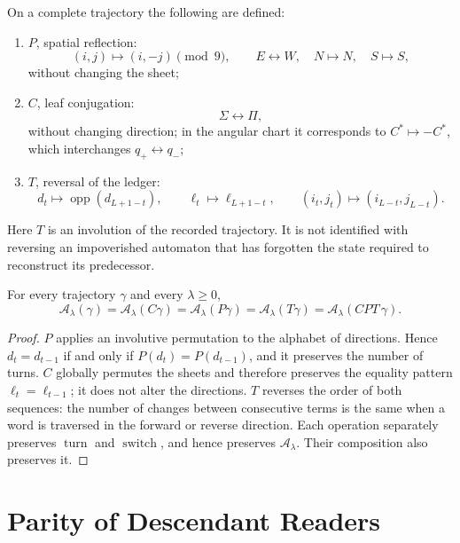 \begin{definition}
\label{def:cpt-discreto-rutas-rev6}
On a complete trajectory the following are defined:
\begin{enumerate}
\item \(P\), spatial reflection:
\[
 (i,j)\longmapsto(i,-j)\pmod9,
 \qquad E\leftrightarrow W,\quad N\mapsto N,\quad S\mapsto S,
\]
without changing the sheet;
\item \(C\), leaf conjugation:
\[
 \Sigma\leftrightarrow\Pi,
\]
without changing direction; in the angular chart it corresponds to
\(C^*\mapsto-C^*\), which interchanges \(q_+\leftrightarrow q_-\);
\item \(T\), reversal of the ledger:
\[
 d_t\longmapsto\operatorname{opp}(d_{L+1-t}),
 \qquad
 \ell_t\longmapsto\ell_{L+1-t},
 \qquad
 (i_t,j_t)\longmapsto(i_{L-t},j_{L-t}).
\]
\end{enumerate}
\end{definition}

Here \(T\) is an involution of the recorded trajectory. It is not identified
with reversing an impoverished automaton that has forgotten the state required
to reconstruct its predecessor.

\begin{theorem}
\label{thm:invariancia-cpt-discreta-rev6}
For every trajectory \(\gamma\) and every \(\lambda\geq0\),
\[
 \boxed{
 \mathcal A_\lambda(\gamma)
 =
 \mathcal A_\lambda(C\gamma)
 =
 \mathcal A_\lambda(P\gamma)
 =
 \mathcal A_\lambda(T\gamma)
 =
 \mathcal A_\lambda(CPT\,\gamma).}
\]
\end{theorem}

\begin{proof}
\(P\) applies an involutive permutation to the alphabet of directions. Hence \(d_t=d_{t-1}\) if and only if \(P(d_t)=P(d_{t-1})\), and it preserves the number of turns. \(C\) globally permutes the sheets and therefore preserves the equality pattern \(\ell_t=\ell_{t-1}\); it does not alter the directions. \(T\) reverses the order of both sequences: the number of changes between consecutive terms is the same when a word is traversed in the forward or reverse direction. Each operation separately preserves \(\operatorname{turn}\) and \(\operatorname{switch}\), and hence preserves \(\mathcal A_\lambda\). Their composition also preserves it.
\end{proof}

\section{Parity of Descendant Readers}

